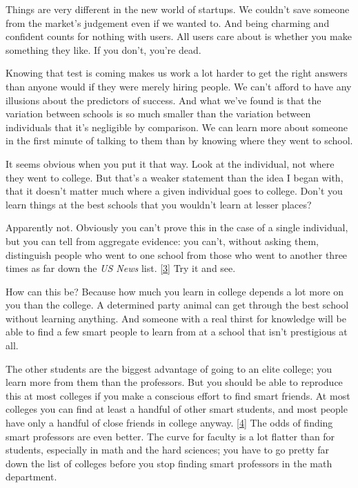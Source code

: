 Things are
                  very different in the new world of startups. We couldn't save
                  someone from the market's judgement even if we wanted to. And
                  being charming and confident counts for nothing with users.
                  All users care about is whether you make something they like.
                  If you don't, you're dead.

Knowing that test is
                  coming makes us work a lot harder to get the right answers
                  than anyone would if they were merely hiring people. We can't
                  afford to have any illusions about the predictors of success.
                  And what we've found is that the variation between schools is
                  so much smaller than the variation between individuals that
                  it's negligible by comparison. We can learn more about someone
                  in the first minute of talking to them than by knowing where
                  they went to school.

It seems obvious when you put
                  it that way. Look at the individual, not where they went to
                  college. But that's a weaker statement than the idea I began
                  with, that it doesn't matter much where a given individual
                  goes to college. Don't you learn things at the best schools
                  that you wouldn't learn at lesser places?

Apparently
                  not. Obviously you can't prove this in the case of a single
                  individual, but you can tell from aggregate evidence: you
                  can't, without asking them, distinguish people who went to one
                  school from those who went to another three times as far down
                  the \emph{US News} list.
                  [\href{\#f3n}{3}]
                  Try it and see.

How can this be? Because how much
                  you learn in college depends a lot more on you than the
                  college. A determined party animal can get through the best
                  school without learning anything. And someone with a real
                  thirst for knowledge will be able to find a few smart people
                  to learn from at a school that isn't prestigious at all.


                  The other students are the biggest advantage of going to an
                  elite college; you learn more from them than the professors.
                  But you should be able to reproduce this at most colleges if
                  you make a conscious effort to find smart friends. At most
                  colleges you can find at least a handful of other smart
                  students, and most people have only a handful of close friends
                  in college anyway.
                  [\href{\#f4n}{4}]
                  The odds of finding smart professors are even better. The
                  curve for faculty is a lot flatter than for students,
                  especially in math and the hard sciences; you have to go
                  pretty far down the list of colleges before you stop finding
                  smart professors in the math department.

